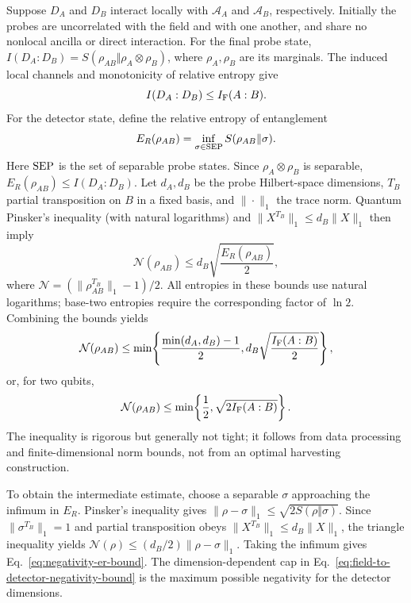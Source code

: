 \documentclass[pdflatex,sn-mathphys-num]{sn-jnl}
\begin{document}
Suppose $D_A$ and $D_B$ interact locally with $\mathcal A_A$ and $\mathcal A_B$, respectively. Initially the probes are uncorrelated with the field and with one another, and share no nonlocal ancilla or direct interaction. For the final probe state, $I(D_A:D_B)=S(\rho_{AB}\Vert\rho_A\otimes\rho_B)$, where $\rho_A,\rho_B$ are its marginals. The induced local channels and monotonicity of relative entropy give
\begin{equation}
I(D_A:D_B)\leq I_{\rm F}(A:B).
\label{eq:detector-mutual-info-dpi}
\end{equation}
For the detector state, define the relative entropy of entanglement
\begin{equation}
E_R(\rho_{AB})=\inf_{\sigma\in{\rm SEP}}S(\rho_{AB}\Vert\sigma).
\label{eq:relative-entropy-entanglement}
\end{equation}
Here ${\rm SEP}$ is the set of separable probe states. Since $\rho_A\otimes\rho_B$ is separable, $E_R(\rho_{AB})\leq I(D_A:D_B)$. Let $d_A,d_B$ be the probe Hilbert-space dimensions, $T_B$ partial transposition on $B$ in a fixed basis, and $\|\cdot\|_1$ the trace norm. Quantum Pinsker's inequality (with natural logarithms) and $\|X^{T_B}\|_1\leq d_B\|X\|_1$ then imply
\begin{equation}
\mathcal N(\rho_{AB})\leq d_B\sqrt{\frac{E_R(\rho_{AB})}{2}},
\label{eq:negativity-er-bound}
\end{equation}
where $\mathcal N=(\|\rho_{AB}^{T_B}\|_1-1)/2$. All entropies in these bounds use natural logarithms; base-two entropies require the corresponding factor of $\ln 2$. Combining the bounds yields
\begin{equation}
\mathcal N(\rho_{AB})\leq
\min\!\left\{\frac{\min(d_A,d_B)-1}{2},
d_B\sqrt{\frac{I_{\rm F}(A:B)}{2}}\right\},
\label{eq:field-to-detector-negativity-bound}
\end{equation}
or, for two qubits,
\begin{equation}
\mathcal N(\rho_{AB})\leq
\min\!\left\{\frac12,\sqrt{2I_{\rm F}(A:B)}\right\}.
\label{eq:two-qubit-field-negativity-bound}
\end{equation}
The inequality is rigorous but generally not tight; it follows from data processing and finite-dimensional norm bounds, not from an optimal harvesting construction.

To obtain the intermediate estimate, choose a separable $\sigma$ approaching the infimum in $E_R$. Pinsker's inequality gives $\|\rho-\sigma\|_1\leq\sqrt{2S(\rho\Vert\sigma)}$. Since $\|\sigma^{T_B}\|_1=1$ and partial transposition obeys $\|X^{T_B}\|_1\leq d_B\|X\|_1$, the triangle inequality yields $\mathcal N(\rho)\leq(d_B/2)\|\rho-\sigma\|_1$. Taking the infimum gives Eq.~\eqref{eq:negativity-er-bound}. The dimension-dependent cap in Eq.~\eqref{eq:field-to-detector-negativity-bound} is the maximum possible negativity for the detector dimensions.
\end{document}
